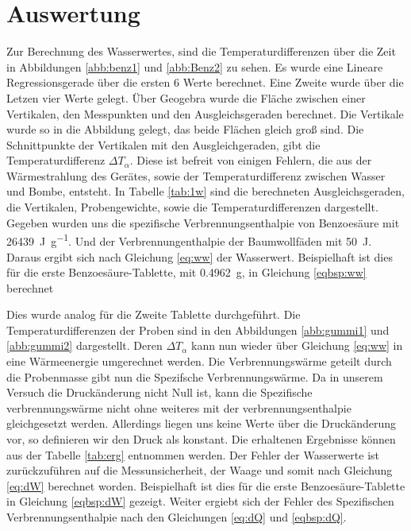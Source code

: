 \section{Auswertung}
Zur Berechnung des Wasserwertes, sind die Temperaturdifferenzen über die Zeit in Abbildungen \ref{abb:benz1} und \ref{abb:Benz2} zu sehen.
Es wurde eine Lineare Regressionsgerade über die ersten 6 Werte berechnet. 
Eine Zweite wurde über die Letzen vier Werte gelegt.
Über Geogebra wurde die Fläche zwischen einer Vertikalen, den Messpunkten und den Ausgleichsgeraden berechnet.
Die Vertikale wurde so in die Abbildung gelegt, das beide Flächen gleich groß sind.
Die Schnittpunkte der Vertikalen mit den Ausgleichgeraden, gibt die Temperaturdifferenz $\Delta T_\alpha$.
Diese ist befreit von einigen Fehlern, die aus der Wärmestrahlung des Gerätes, sowie der Temperaturdifferenz zwischen Wasser und Bombe, entsteht.
In Tabelle \ref{tab:1w} sind die berechneten Ausgleichsgeraden, die Vertikalen, Probengewichte, sowie die Temperaturdifferenzen dargestellt.
Gegeben wurden uns die spezifische Verbrennungsenthalpie von Benzoesäure mit \qty{26439}{\joule\per\gram}.
Und der Verbrennungenthalpie der Baumwollfäden mit \qty{50}{\joule}.
Daraus ergibt sich nach Gleichung \ref{eq:ww} der Wasserwert.
Beispielhaft ist dies für die erste Benzoesäure-Tablette, mit \qty{0,4962}{\gram}, in Gleichung \ref{eqbsp:ww} berechnet


Dies wurde analog für die Zweite Tablette durchgeführt.
Die Temperaturdifferenzen der Proben sind in den Abbildungen \ref{abb:gummi1} und \ref{abb:gummi2} dargestellt.
Deren $\Delta T_\alpha$ kann nun wieder über Gleichung \ref{eq:ww} in eine Wärmeenergie umgerechnet werden.
Die Verbrennungswärme geteilt durch die Probenmasse gibt nun die Spezifsche Verbrennungswärme. 
Da in unserem Versuch die Druckänderung nicht Null ist, kann die Spezifische verbrennungswärme nicht ohne weiteres mit der verbrennungsenthalpie gleichgesetzt werden.
Allerdings liegen uns keine Werte über die Druckänderung vor, so definieren wir den Druck als konstant.
Die erhaltenen  Ergebnisse können aus der Tabelle \ref{tab:erg} entnommen werden.
Der Fehler der Wasserwerte ist zurückzuführen auf die Messunsicherheit, der Waage und somit nach Gleichung \ref{eq:dW} berechnet worden.
Beispielhaft ist dies für die erste Benzoesäure-Tablette in Gleichung \ref{eqbsp:dW} gezeigt.
Weiter ergiebt sich der Fehler des Spezifischen Verbrennungsenthalpie nach den Gleichungen \ref{eq:dQ} und \ref{eqbsp:dQ}.
